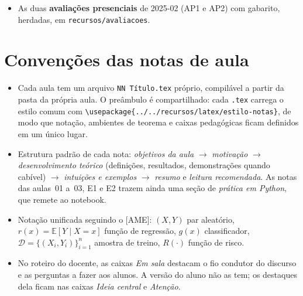 \documentclass[11pt,a4paper]{article}
\begin{document}
\begin{itemize}[leftmargin=1.4cm]
        dois de cada uma das aulas~07, 08 e~09 e três da aula~10,
        cobrindo o Bloco~II, da qual foram sorteadas as três questões da
        \texttt{Avaliacao teorica 02}, uma por aula. A
        \texttt{Verificacao de reposicao} (VR, a segunda chamada) e a
        \texttt{Verificacao suplementar} (VS, a prova final) têm quatro questões
        cada, duas sorteadas de cada lista, nenhuma em comum com as outras provas.
        Como nas listas, o gabarito sai do mesmo arquivo-fonte do enunciado.
        O \texttt{Trabalho pratico 01}, na mesma pasta, cobre as aulas~01 a~10
        em quinze tarefas sobre dois conjuntos de dados reais, um de regressão e
        um de classificação, com um notebook de partida para o aluno, uma
        resolução de referência e o roteiro de correção.
  \item As duas \textbf{avaliações presenciais} de 2025-02 (AP1 e AP2) com
        gabarito, herdadas, em \texttt{recursos/avaliacoes}.
\end{itemize}

\section{Convenções das notas de aula}
\begin{itemize}[leftmargin=1.4cm]
  \item Cada aula tem um arquivo \texttt{NN Título.tex} próprio, compilável a
        partir da pasta da própria aula. O preâmbulo é compartilhado: cada
        \texttt{.tex} carrega o estilo comum com
        \verb|\usepackage{../../recursos/latex/estilo-notas}|, de modo que
        notação, ambientes de teorema e caixas pedagógicas ficam definidos em um
        único lugar.
  \item Estrutura padrão de cada nota: \emph{objetivos da aula} $\to$
        \emph{motivação} $\to$ \emph{desenvolvimento teórico} (definições,
        resultados, demonstrações quando cabível) $\to$ \emph{intuições e exemplos}
        $\to$ \emph{resumo} e \emph{leitura recomendada}. As notas das aulas~01
        a~03, E1 e E2 trazem ainda uma seção de \emph{prática em Python}, que
        remete ao notebook.
  \item Notação unificada seguindo o [AME]: $(X,Y)$ par aleatório,
        $r(x)=\mathbb{E}[Y\mid X=x]$ função de regressão, $g(x)$ classificador,
        $\mathcal{D}=\{(X_i,Y_i)\}_{i=1}^n$ amostra de treino, $R(\cdot)$ função de
        risco.
  \item No roteiro do docente, as caixas \emph{Em sala} destacam o fio condutor do
        discurso e as perguntas a fazer aos alunos. A versão do aluno não as tem;
        os destaques dela ficam nas caixas \emph{Ideia central} e \emph{Atenção}.
\end{itemize}
\end{document}
